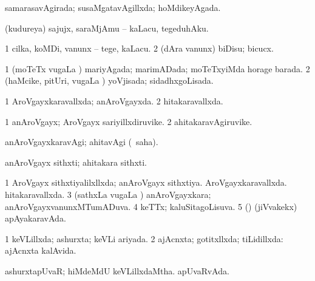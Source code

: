 {\bentry
{} 
\gl{\gu}
\expl{}
\bmng
samarasavAgirada; susaMgatavAgillxda; hoMdikeyAgada. 
\emng
\eentry

\bentry
{} 
\gl{\sakirx}
\expl{}
\bmng
(kudureya) sajujx, saraMjAmu -- kaLacu, tegeduhAku. 
\emng
\eentry

\bentry
{} 
\gl{\sakirx}
\expl{}
\bmng
\bnum
\num{1} cilka, koMDi, \mo vanunx -- tege, kaLacu. 
\num{2} (dAra \mo vanunx) biDisu; bicucx. 
\enum
\emng
\eentry

\bentry
{} 
\gl{\gu}
\expl{}
\bmng
\bnum
\num{1} (moTeTx \mo vugaLa \vi) mariyAgada; marimADada; moTeTxyiMda horage barada. 
\num{2} (haMcike, pitUri, \mo vugaLa \vi) yoVjisada; sidadhxgoLisada. 
\enum
\emng
\eentry

\bentry
{} 
\gl{\gu}
\expl{}
\bmng
\bnum
\num{1} AroVgayxkaravallxda; anAroVgayxda. 
\num{2} hitakaravallxda. 
\enum
\emng
\eentry

\bentry
{} 
\gl{\nA}
\expl{}
\bmng
\bnum
\num{1} anAroVgayx; AroVgayx sariyillxdiruvike. 
\num{2} ahitakaravAgiruvike. 
\enum
\emng
\eentry

\bentry
{} 
\gl{\kirxvi}
\expl{}
\bmng
anAroVgayxkaravAgi; ahitavAgi (\rUpa\ saha). 
\emng
\eentry

\bentry
{} 
\gl{\nA}
\expl{}
\bmng
anAroVgayx sithxti; ahitakara sithxti. 
\emng
\eentry

\bentry
{} 
\gl{\gu}
\bmng
\bnum
\num{1} AroVgayx sithxtiyalilxllxda; anAroVgayx sithxtiya. 
\banum
{} AroVgayxkaravallxda. 
 hitakaravallxda. 
\eanum
\numie
\num{3} (sathxLa \mo vugaLa \vi) anAroVgayxkara; anAroVgayxvanunxMTumADuva. 
\num{4} keTTx; kaluSitagoLisuva. 
\num{5} (\ashi) (jiVvakekx) apAyakaravAda. 
\enum
\emng
\eentry

\bentry
{} 
\gl{\gu}
\expl{}
\bmng
\bnum
\num{1} keVLillxda; ashurxta; keVLi ariyada. 
\num{2} ajAcnxta; gotitxllxda; tiLidillxda:  ajAcnxta kalAvida. 
\enum
\emng
\eentry

\bentry
{} 
\gl{\gu}
\expl{}
\bmng
\banum
{} ashurxtapUvaR; hiMdeMdU keVLillxdaMtha. 
 apUvaRvAda. 
\eanum
\emng
\eentry

}

